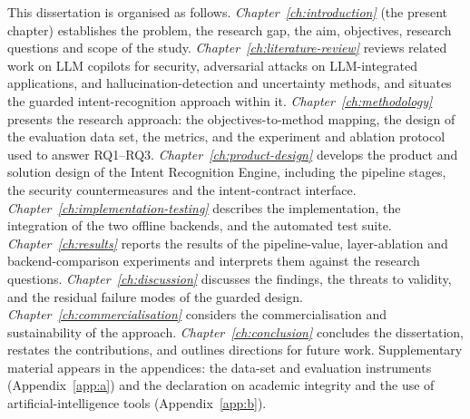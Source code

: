 This dissertation is organised as follows. \emph{Chapter~\ref{ch:introduction}}
(the present chapter) establishes the problem, the research gap, the aim,
objectives, research questions and scope of the study.
\emph{Chapter~\ref{ch:literature-review}} reviews related work on LLM copilots
for security, adversarial attacks on LLM-integrated applications, and
hallucination-detection and uncertainty methods, and situates the guarded
intent-recognition approach within it.
\emph{Chapter~\ref{ch:methodology}} presents the research approach: the
objectives-to-method mapping, the design of the evaluation data set, the
metrics, and the experiment and ablation protocol used to answer RQ1--RQ3.
\emph{Chapter~\ref{ch:product-design}} develops the product and solution
design of the Intent Recognition Engine, including the pipeline stages, the
security countermeasures and the intent-contract interface.
\emph{Chapter~\ref{ch:implementation-testing}} describes the implementation,
the integration of the two offline backends, and the automated test suite.
\emph{Chapter~\ref{ch:results}} reports the results of the pipeline-value,
layer-ablation and backend-comparison experiments and interprets them against
the research questions.
\emph{Chapter~\ref{ch:discussion}} discusses the findings, the threats to
validity, and the residual failure modes of the guarded design.
\emph{Chapter~\ref{ch:commercialisation}} considers the commercialisation and
sustainability of the approach.
\emph{Chapter~\ref{ch:conclusion}} concludes the dissertation, restates the
contributions, and outlines directions for future work. Supplementary material
appears in the appendices: the data-set and evaluation instruments
(Appendix~\ref{app:a}) and the declaration on academic integrity and the use of
artificial-intelligence tools (Appendix~\ref{app:b}).